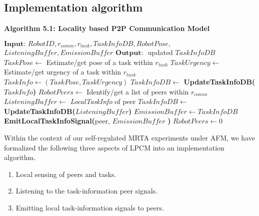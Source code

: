 \subsection{Implementation algorithm}

\textbf{\small Algorithm 5.1: Locality based P2P Communication Model}
\vspace{-3mm}
\newline
\HRule
\begin{algorithmic}[1]
\label{alg:lpcm}
\State $\textbf{Input: } RobotID, r_{comm}, r_{task}, TaskInfoDB, RobotPose,$\\ \hspace*{1cm}$ListeningBuffer, EmissionBuffer$
\State $\textbf{Output: }$ updated $TaskInfoDB$
\State {}
\State $ TaskPose \gets $ Estimate/get pose of a task within $r_{task}$
\State $ TaskUrgency \gets $ Estimate/get urgency of a task within $r_{task}$
\State $ TaskInfo \gets (TaskPose, TaskUrgency) $ 
\State $TaskInfoDB \gets$ \textbf{UpdateTaskInfoDB(}$TaskInfo$\textbf{)}
\State {}
\State $ RobotPeers \gets $ Identify/get a list of peers within $r_{comm}$
\State $ListeningBuffer \gets $ \textit{\textit{LocalTaskInfo}} of peer
\State $TaskInfoDB \gets$ \textbf{UpdateTaskInfoDB(}$ListeningBuffer$\textbf{)}
\EndIf
\EndFor
\State {}
\State $ EmissionBuffer \gets TaskInfoDB$
\State \textbf{EmitLocalTaskInfoSignal(}peer, $EmissionBuffer$ \textbf{) }
\EndFor
\State $RobotPeers \gets 0$
\end{algorithmic}
Within the context of our self-regulated MRTA experiments under AFM,  we have formalized the following three aspects of LPCM into an implementation algorithm. 
\begin{enumerate}
\item Local sensing of peers and tasks.
\item Listening to the task-information peer signals.
\item Emitting local task-information signals to peers.
\end{enumerate}
